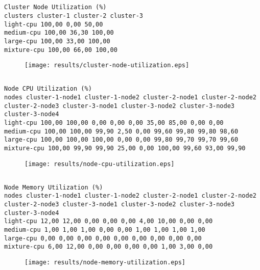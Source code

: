 \documentclass{elsart}
\begin{document}
\subsection{}

\begin{lstlisting}[caption={}]
Cluster Node Utilization (%)
clusters cluster-1 cluster-2 cluster-3
light-cpu 100,00 0,00 50,00
medium-cpu 100,00 36,30 100,00
large-cpu 100,00 33,00 100,00
mixture-cpu 100,00 66,00 100,00
\end{lstlisting}

\begin{figure}[ht]
\centering
\texttt{[image: results/cluster-node-utilization.eps]}
\caption{}\label{fig:cluster-node-utilization.eps}
\end{figure}

\subsection{}

\begin{lstlisting}[caption={}]
Node CPU Utilization (%)
nodes cluster-1-node1 cluster-1-node2 cluster-2-node1 cluster-2-node2 cluster-2-node3 cluster-3-node1 cluster-3-node2 cluster-3-node3 cluster-3-node4
light-cpu 100,00 100,00 0,00 0,00 0,00 35,00 85,00 0,00 0,00
medium-cpu 100,00 100,00 99,90 2,50 0,00 99,60 99,80 99,80 98,60
large-cpu 100,00 100,00 100,00 0,00 0,00 99,80 99,70 99,70 99,60
mixture-cpu 100,00 99,90 99,90 25,00 0,00 100,00 99,60 93,00 99,90
\end{lstlisting}

\begin{figure}[ht]
\centering
\texttt{[image: results/node-cpu-utilization.eps]}
\caption{}\label{fig:node-cpu-utilization.eps}
\end{figure}

\subsection{}

\begin{lstlisting}[caption={}]
Node Memory Utilization (%)
nodes cluster-1-node1 cluster-1-node2 cluster-2-node1 cluster-2-node2 cluster-2-node3 cluster-3-node1 cluster-3-node2 cluster-3-node3 cluster-3-node4
light-cpu 12,00 12,00 0,00 0,00 0,00 4,00 10,00 0,00 0,00
medium-cpu 1,00 1,00 1,00 0,00 0,00 1,00 1,00 1,00 1,00
large-cpu 0,00 0,00 0,00 0,00 0,00 0,00 0,00 0,00 0,00
mixture-cpu 6,00 12,00 0,00 0,00 0,00 0,00 1,00 3,00 0,00
\end{lstlisting}

\begin{figure}[ht]
\centering
\texttt{[image: results/node-memory-utilization.eps]}
\caption{}\label{fig:node-memory-utilization.eps}
\end{figure}
\end{document}
